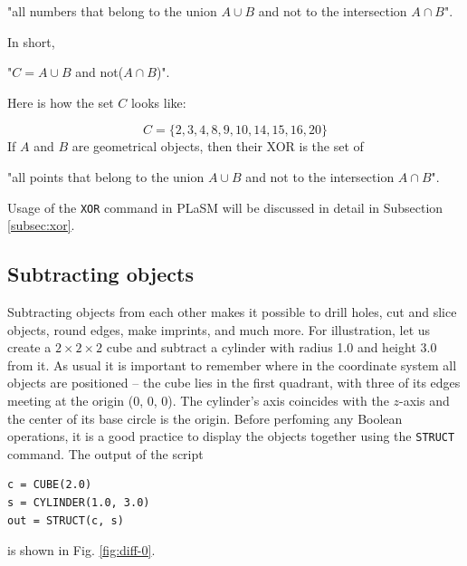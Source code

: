 \centerline{
"all numbers that belong to the union $A \cup B$ {\color{red}and not} to the intersection $A \cap B$".
}
\vspace{4mm}
\noindent
In short,\\

\centerline{
"$C = A \cup B$ {\color{red}and not}($A \cap B$)".
}
\vspace{4mm}
\noindent
Here is how the set $C$ looks like:

$$
C = \{2, 3, 4, 8, 9, 10, 14, 15, 16, 20\}
$$
If $A$ and $B$ are geometrical objects, then their XOR is the set of \\

\centerline{
"all points that belong to the union $A \cup B$ {\color{red}and not} to the intersection $A \cap B$".
}
\vspace{4mm}
\noindent
Usage of the {\tt XOR} command in PLaSM will be discussed in detail 
in Subsection \ref{subsec:xor}.


\subsection{Subtracting objects}\label{subsec:subtract}

Subtracting objects from each other makes it possible 
to drill holes, cut and slice objects, round edges, make 
imprints, and much more. 
For illustration, let us create a $2 \times 2 \times 2$ cube and subtract 
a cylinder with radius 1.0 and height 3.0 from it. As usual it is important to remember where 
in the coordinate system all objects are positioned -- the cube lies in the 
first quadrant, with three of its edges meeting at the origin (0, 0, 0).
The cylinder's axis coincides with the $z$-axis and the center of its base
circle is the origin. Before perfoming any Boolean operations, it is a good 
practice to display the objects together using the {\tt STRUCT} command. The 
output of the script

\begin{bbox}
\begin{verbatim}
c = CUBE(2.0)
s = CYLINDER(1.0, 3.0)
out = STRUCT(c, s) 
\end{verbatim}
\end{bbox}
\vspace{6mm}

\noindent
is shown in Fig. \ref{fig:diff-0}.
\newpage

